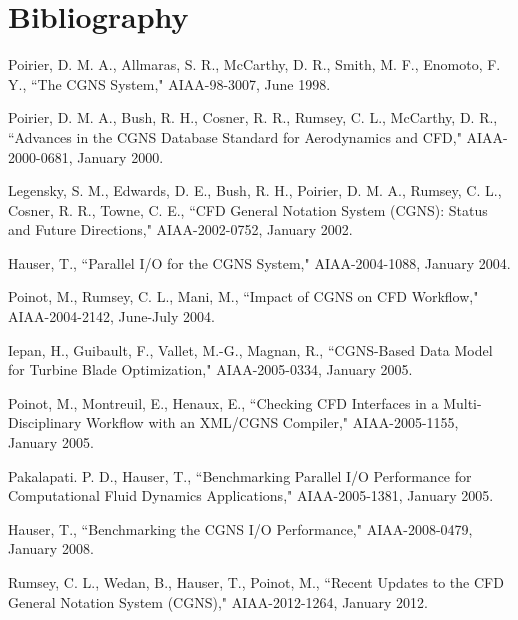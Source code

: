 \section{Bibliography}
\label{s:biblio}

Poirier, D. M. A., Allmaras, S. R., McCarthy, D. R., Smith, M. F., Enomoto, F. Y.,
``The CGNS System," AIAA-98-3007, June 1998.

Poirier, D. M. A., Bush, R. H., Cosner, R. R., Rumsey, C. L., McCarthy, D. R.,
``Advances in the CGNS Database Standard for Aerodynamics and CFD,"
AIAA-2000-0681, January 2000.

Legensky, S. M., Edwards, D. E., Bush, R. H., Poirier, D. M. A., Rumsey, C. L., Cosner, R. R., Towne, C. E.,
``CFD General Notation System (CGNS): Status and Future Directions,"
AIAA-2002-0752, January 2002.

Hauser, T., ``Parallel I/O for the CGNS System," AIAA-2004-1088, January 2004.

Poinot, M., Rumsey, C. L., Mani, M., 
``Impact of CGNS on CFD Workflow," AIAA-2004-2142, June-July 2004.

Iepan, H., Guibault, F., Vallet, M.-G., Magnan, R.,
``CGNS-Based Data Model for Turbine Blade Optimization,"
AIAA-2005-0334, January 2005.

Poinot, M., Montreuil, E., Henaux, E.,
``Checking CFD Interfaces in a Multi-Disciplinary Workflow with an XML/CGNS Compiler,"
AIAA-2005-1155, January 2005.

Pakalapati. P. D., Hauser, T.,
``Benchmarking Parallel I/O Performance for Computational Fluid Dynamics Applications,"
AIAA-2005-1381, January 2005.

Hauser, T.,
``Benchmarking the CGNS I/O Performance,"
AIAA-2008-0479, January 2008.

Rumsey, C. L., Wedan, B., Hauser, T., Poinot, M.,
``Recent Updates to the CFD General Notation System (CGNS),"
AIAA-2012-1264, January 2012.
